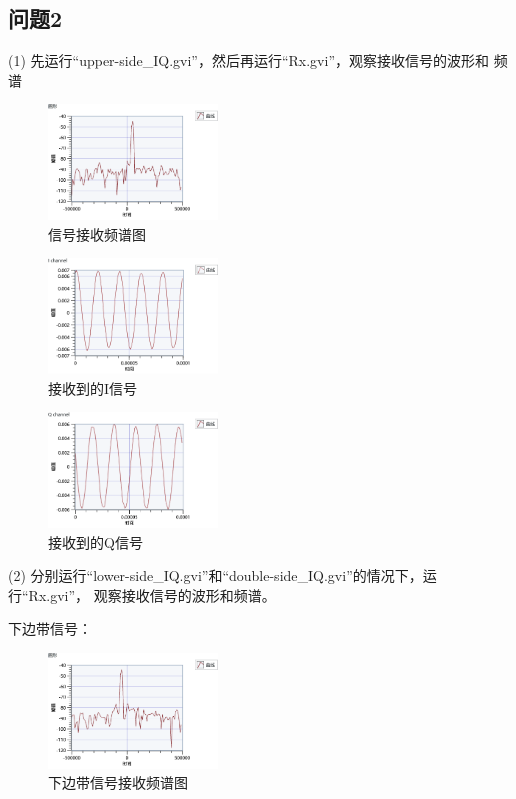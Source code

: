 \documentclass{../source/Experiment}
\begin{document}
        \subsection{问题2}
        (1) 先运行“upper-side\_IQ.gvi”，然后再运行“Rx.gvi”，观察接收信号的波形和 频谱
        \begin{figure}[H]
            \centering
            \includegraphics[width = 0.4\textwidth]{lab9/UPPER.png}
            \caption{信号接收频谱图}
        \end{figure}
        \begin{figure}[H]
            \centering
            \includegraphics[width = 0.4\textwidth]{lab9/UPPER_I.png}
            \caption{接收到的I信号}
        \end{figure}
        \begin{figure}[H]
            \centering
            \includegraphics[width = 0.4\textwidth]{lab9/UPPER_Q.png}
            \caption{接收到的Q信号}
        \end{figure}

        (2) 分别运行“lower-side\_IQ.gvi”和“double-side\_IQ.gvi”的情况下，运行“Rx.gvi”， 观察接收信号的波形和频谱。 
        
        下边带信号：
        \begin{figure}[H]
            \centering
            \includegraphics[width = 0.4\textwidth]{lab9/LOWER.png}
            \caption{下边带信号接收频谱图}
        \end{figure}
   
\end{document}

